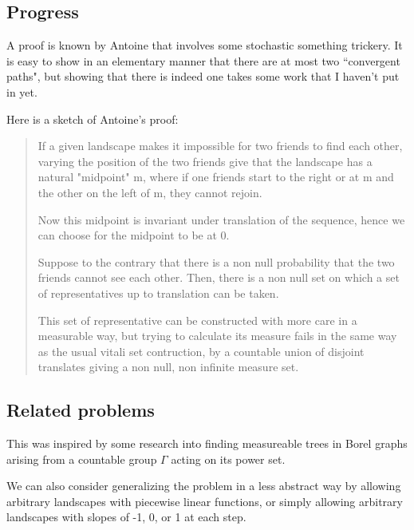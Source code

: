 \subsection{Progress}

A proof is known by Antoine that involves some stochastic something trickery. It is easy to show in an elementary manner that there are at most two ``convergent paths", but showing that there is indeed one takes some work that I haven't put in yet.

Here is a sketch of Antoine's proof:

\begin{quote}
  If a given landscape makes it impossible for two friends to find each other, varying the position of the two friends give that the landscape has a natural "midpoint" m, where if one friends start to the right or at m and the other on the left of m, they cannot rejoin. 

  Now this midpoint is invariant under translation of the sequence, hence we can choose for the midpoint to be at 0.

  Suppose to the contrary that there is a non null probability that the two friends cannot see each other. Then, there is a non null set on which a set of representatives up to translation can be taken.

  This set of representative can be constructed with more care in a measurable way, but trying to calculate its measure fails in the same way as the usual vitali set contruction, by a countable union of disjoint translates giving a non null, non infinite measure set.
\end{quote}

\subsection{Related problems}

This was inspired by some research into finding measureable trees in Borel graphs arising from a countable group $\Gamma$ acting on its power set.

We can also consider generalizing the problem in a less abstract way by allowing arbitrary landscapes with piecewise linear functions, or simply allowing arbitrary landscapes with slopes of -1, 0, or 1 at each step.

